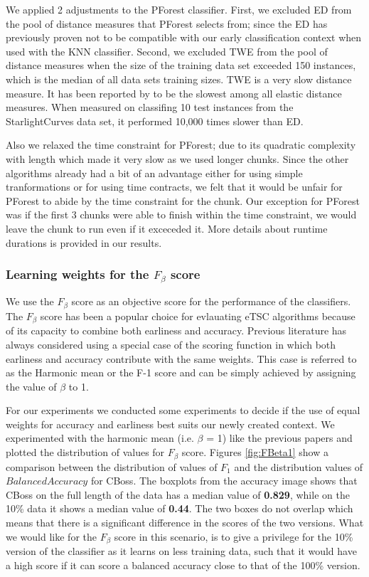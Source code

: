 We applied 2 adjustments to the PForest classifier.
First, we excluded ED from the pool of distance measures that PForest selects from; since the ED has previously proven not to be compatible with our early classification context when used with the KNN classifier.
Second, we excluded TWE from the pool of distance measures when the size of the training data set exceeded 150 instances, which is the median of all data sets training sizes.
TWE is a very slow distance measure. It has been reported by \cite{bagnall2017great} to be the slowest among all elastic distance measures. When measured on classifing 10 test instances from the
StarlightCurves data set, it performed 10,000 times slower than ED.

Also we relaxed the time constraint for PForest; due to its quadratic complexity with length \cite{lucas2019proximity} which made it very slow as we used longer chunks.
Since the other algorithms already had a bit of an advantage either for using simple tranformations or for using time contracts,
we felt that it would be unfair for PForest to abide by the time constraint for the  chunk.
Our exception for PForest was if the first 3 chunks were able to finish within the time constraint, we would leave the  chunk to run even if it exceceded it.
More details about runtime durations is provided in our results.


\subsubsection{Learning weights for the $F_{\beta}$ score}
\label{SubsubsectionLearningFBetaMeasure}
We use the $F_{\beta}$ score as an objective score for the performance of the classifiers.
The $F_{\beta}$ score has been a popular choice for evlauating eTSC algorithms \cite{schafer2020teaser} because of its
capacity to combine both earliness and accuracy.
Previous literature has always considered using a special case of the scoring function in which both earliness and accuracy contribute with the same weights.
This case is referred to as the Harmonic mean or the F-1 score and can be simply achieved by assigning the value of $\beta$ to 1.

For our experiments we conducted some experiments to decide if the use of equal weights for accuracy and earliness best suits our newly created context.
We experimented with the harmonic mean (i.e. $\beta$ = 1) like the previous papers and plotted the distribution of values for $F_{\beta}$ score.
Figures \ref{fig:FBeta1} show a comparison between the distribution of values of $F_{1}$ and the distribution values of $Balanced Accuracy$ for CBoss.
The boxplots from the accuracy image shows that CBoss on the full length of the data has a median value of \textbf{0.829}, while on the 10\% data it shows a median value of \textbf{0.44}.
The two boxes do not overlap which means that there is a significant difference in the scores of the two versions.
What we would like for the $F_{\beta}$ score in this scenario, is to give a privilege for the 10\% version of the classifier as it learns on less training data, such that it would have
a high score if it can score a balanced accuracy close to that of the 100\% version.


